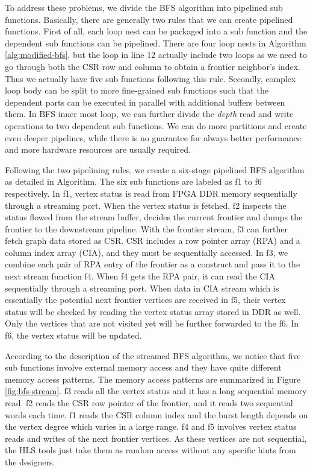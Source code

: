 To address these problems, we divide the BFS algorithm into pipelined 
sub functions. Basically, there are generally two rules that 
we can create pipelined functions. 
First of all, each loop nest can be packaged into a sub function 
and the dependent sub functions can be pipelined. There are four loop 
nests in Algorithm \ref{alg:modified-bfs}, 
but the loop in line 12 actually include two loops as we need to go through 
both the CSR row and column to obtain a frontier neighbor's index. Thus we 
actually have five sub functions following this rule. Secondly, complex loop body 
can be split to more fine-grained sub functions such that the dependent parts can 
be executed in parallel with additional buffers between them. 
In BFS inner most loop, we can further divide the \textit{depth} read and write 
operations to two dependent sub functions. We can 
do more partitions and create even deeper pipelines, while there is no 
guarantee for always better performance and more hardware resources 
are usually required.

Following the two pipelining rules, we create a six-stage 
pipelined BFS algorithm as detailed in Algorithm. 
The six sub functions are labeled as f1 to f6 respectively. In f1, 
vertex status is read from FPGA DDR memory sequentially through a streaming port. 
When the vertex status is fetched, f2 inspects the status 
flowed from the stream buffer, decides the current frontier 
and dumps the frontier to the downstream pipeline. 
With the frontier stream, f3 can further fetch graph 
data stored as CSR. CSR includes a row pointer array (RPA) 
and a column index array (CIA), and they must be sequentially accessed. 
In f3, we combine each pair of RPA entry of the frontier as a construct 
and pass it to the next stream function f4. When f4 gets the RPA pair, 
it can read the CIA sequentially through a streaming port. 
When data in CIA stream which is essentially the potential 
next frontier vertices are received in f5, their vertex status 
will be checked by reading the vertex status array stored in DDR as well.
Only the vertices that are not visited yet will be further forwarded to the f6. 
In f6, the vertex status will be updated.

According to the description of the streamed BFS algorithm, we notice that 
five sub functions involve external memory access and they have quite different 
memory access patterns. The memory access patterns are summarized in 
Figure \ref{fig:bfs-stream}. f3 reads all the vertex status and 
it has a long sequential memory read. f2 reads the CSR row pointer of the frontier, 
and it reads two sequential words each time. f1 reads the CSR column index and the 
burst length depends on the vertex degree which varies in a large range. 
f4 and f5 involves vertex status reads and writes of the next frontier vertices.
As these vertices are not sequential, the HLS tools just take them as random access 
without any specific hints from the designers. 

